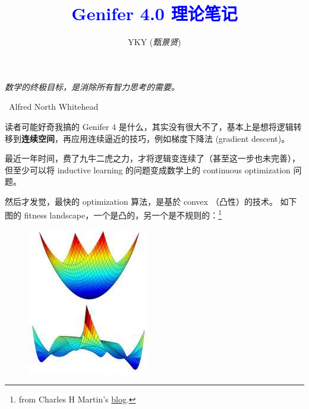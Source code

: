 \documentclass[12pt]{article}
\title{\textcolor{blue}{Genifer 4.0 理论笔记}}
\author{YKY (\textit{甄景贤})}
\newcommand{\tab}{\hspace*{1cm}}
\begin{document}
\tab\tab\tab \parbox{9cm}{\textit{数学的终极目标，是消除所有智力思考的需要。}}
\begin{flushright}
\textemdash\, Alfred North Whitehead \hspace{1cm}
\end{flushright}

\sffamily

{\let\newpage\relax\maketitle}

\maketitle
\setlength{\parindent}{0em}
\setlength{\parskip}{1.5ex plus0.5ex minus1.2ex}

读者可能好奇我搞的 Genifer 4 是什么，其实没有很大不了，基本上是想将逻辑转移到\textbf{连续空间}，再应用连续逼近的技巧，例如梯度下降法 (gradient descent)。

最近一年时间，费了九牛二虎之力，才将逻辑变连续了（甚至这一步也未完善），但至少可以将 inductive learning 的问题变成数学上的 continuous optimization 问题。

然后才发觉，最快的 optimization 算法，是基於 convex （凸性）的技术。  如下图的 fitness landscape，一个是凸的，另一个是不规则的：\footnote{from Charles H Martin's \href{https://charlesmartin14.wordpress.com/2013/11/14/metric-learning-some-quantum-statistical-mechanics/}{blog}.}
\begin{figure}[H]
\centering
\includegraphics[scale=0.6]{convex-and-nonconvex.jpg}
\end{figure}
\end{document}

